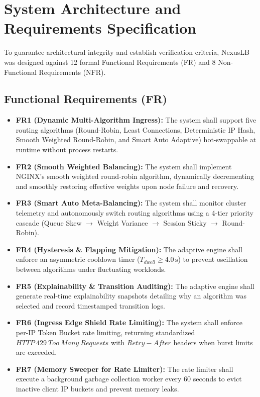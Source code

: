 \documentclass[12pt,openany]{report}
\begin{document}
\section{System Architecture and Requirements Specification}

To guarantee architectural integrity and establish verification criteria, NexusLB was designed against 12 formal Functional Requirements (FR) and 8 Non-Functional Requirements (NFR).

\subsection{Functional Requirements (FR)}
\begin{itemize}
  \item \textbf{FR1 (Dynamic Multi-Algorithm Ingress):} The system shall support five routing algorithms (Round-Robin, Least Connections, Deterministic IP Hash, Smooth Weighted Round-Robin, and Smart Auto Adaptive) hot-swappable at runtime without process restarts.
  \item \textbf{FR2 (Smooth Weighted Balancing):} The system shall implement NGINX's smooth weighted round-robin algorithm, dynamically decrementing and smoothly restoring effective weights upon node failure and recovery.
  \item \textbf{FR3 (Smart Auto Meta-Balancing):} The system shall monitor cluster telemetry and autonomously switch routing algorithms using a 4-tier priority cascade (Queue Skew $\rightarrow$ Weight Variance $\rightarrow$ Session Sticky $\rightarrow$ Round-Robin).
  \item \textbf{FR4 (Hysteresis & Flapping Mitigation):} The adaptive engine shall enforce an asymmetric cooldown timer ($T_{dwell} \ge 4.0\,\text{s}$) to prevent oscillation between algorithms under fluctuating workloads.
  \item \textbf{FR5 (Explainability & Transition Auditing):} The adaptive engine shall generate real-time explainability snapshots detailing why an algorithm was selected and record timestamped transition logs.
  \item \textbf{FR6 (Ingress Edge Shield Rate Limiting):} The system shall enforce per-IP Token Bucket rate limiting, returning standardized $HTTP~429~Too~Many~Requests$ with $Retry-After$ headers when burst limits are exceeded.
  \item \textbf{FR7 (Memory Sweeper for Rate Limiter):} The rate limiter shall execute a background garbage collection worker every 60 seconds to evict inactive client IP buckets and prevent memory leaks.

\end{itemize}
\end{document}
